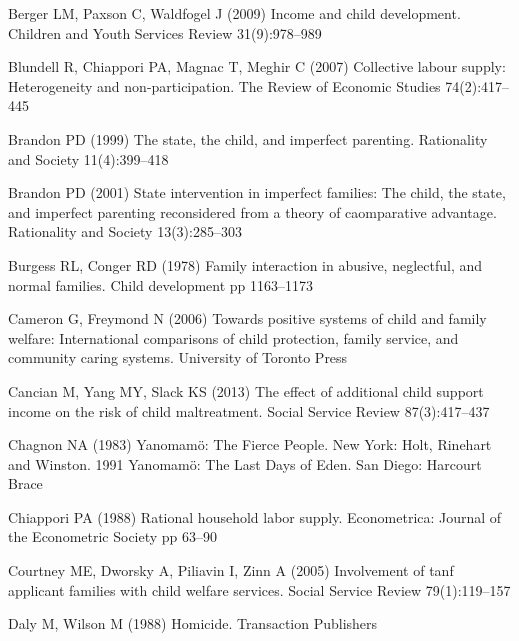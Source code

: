 \begin{thebibliography}{50}
Berger LM, Paxson C, Waldfogel J (2009) Income and child development. Children
  and Youth Services Review 31(9):978--989

Blundell R, Chiappori PA, Magnac T, Meghir C (2007) Collective labour supply:
  Heterogeneity and non-participation. The Review of Economic Studies
  74(2):417--445

Brandon PD (1999) The state, the child, and imperfect parenting. Rationality
  and Society 11(4):399--418

Brandon PD (2001) State intervention in imperfect families: The child, the
  state, and imperfect parenting reconsidered from a theory of caomparative
  advantage. Rationality and Society 13(3):285--303

Burgess RL, Conger RD (1978) Family interaction in abusive, neglectful, and
  normal families. Child development pp 1163--1173

Cameron G, Freymond N (2006) Towards positive systems of child and family
  welfare: International comparisons of child protection, family service, and
  community caring systems. University of Toronto Press

Cancian M, Yang MY, Slack KS (2013) The effect of additional child support
  income on the risk of child maltreatment. Social Service Review
  87(3):417--437

Chagnon NA (1983) Yanomam{\"o}: The Fierce People. New York: Holt, Rinehart and
  Winston. 1991 Yanomam{\"o}: The Last Days of Eden. San Diego: Harcourt Brace

Chiappori PA (1988) Rational household labor supply. Econometrica: Journal of
  the Econometric Society pp 63--90

Courtney ME, Dworsky A, Piliavin I, Zinn A (2005) Involvement of tanf applicant
  families with child welfare services. Social Service Review 79(1):119--157

Daly M, Wilson M (1988) Homicide. Transaction Publishers


\end{thebibliography}
